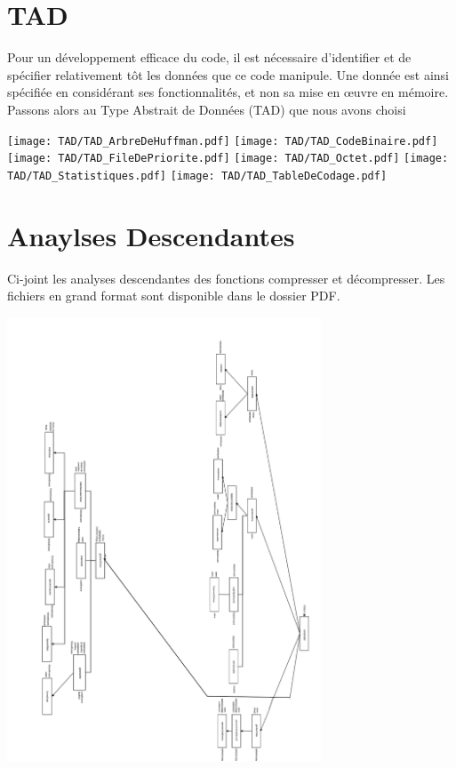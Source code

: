 \documentclass{article}
\begin{document}
\clearpage %

\section{TAD}
    Pour un développement efficace du code, il est nécessaire d’identifier et de
    spécifier relativement tôt les données que ce code manipule. Une donnée est ainsi
    spécifiée en considérant ses fonctionnalités, et non sa mise en œuvre en mémoire.
    Passons alors au Type Abstrait de Données (TAD) que nous avons choisi

    \texttt{[image: TAD/TAD\_ArbreDeHuffman.pdf]}
    \texttt{[image: TAD/TAD\_CodeBinaire.pdf]}
    \texttt{[image: TAD/TAD\_FileDePriorite.pdf]}
    \texttt{[image: TAD/TAD\_Octet.pdf]}
    \texttt{[image: TAD/TAD\_Statistiques.pdf]}
    \texttt{[image: TAD/TAD\_TableDeCodage.pdf]}

\section{Anaylses Descendantes}
    Ci-joint les analyses descendantes des fonctions compresser et décompresser.
    Les fichiers en grand format sont disponible dans le dossier PDF.

    \includegraphics[width=0.7\textwidth]{images/compresser.pdf}
\end{document}
